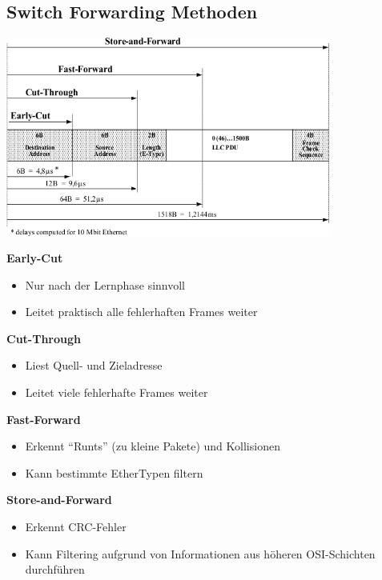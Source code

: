 \subsection{Switch Forwarding Methoden}

\begin{center}
	\includegraphics[width=0.8\textwidth]{media/switch_forwarding.png}
\end{center}

\begin{minipage}[t]{.45\linewidth}
	\textbf{Early-Cut}
	\begin{itemize}
		\item Nur nach der Lernphase sinnvoll
		\item Leitet praktisch alle fehlerhaften Frames weiter
	\end{itemize}
\end{minipage}
\hspace{.1\linewidth}
\begin{minipage}[t]{.45\linewidth}
	\textbf{Cut-Through}
	\begin{itemize}
		\item Liest Quell- und Zieladresse
		\item Leitet viele fehlerhafte Frames weiter
	\end{itemize}
\end{minipage}

\begin{minipage}[t]{.45\linewidth}
	\textbf{Fast-Forward}
	\begin{itemize}
		\item Erkennt ``Runts'' (zu kleine Pakete) und Kollisionen
		\item Kann bestimmte EtherTypen filtern
	\end{itemize}
\end{minipage}
\hspace{.1\linewidth}
\begin{minipage}[t]{.45\linewidth}
	\textbf{Store-and-Forward}
	\begin{itemize}
		\item Erkennt CRC-Fehler
		\item Kann Filtering aufgrund von Informationen aus höheren OSI-Schichten
			durchführen
	\end{itemize}
\end{minipage}

